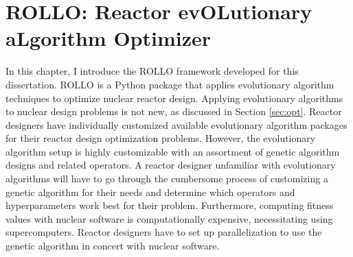 \chapter{ROLLO: Reactor evOLutionary aLgorithm Optimizer}
\label{chap:rollo}
In this chapter, I introduce the \gls{ROLLO} framework developed for this dissertation. 
\gls{ROLLO} is a Python package that applies evolutionary algorithm 
techniques to optimize nuclear reactor design. 
Applying evolutionary algorithms to nuclear design problems is not new, as
discussed in Section \ref{sec:opt}. 
Reactor designers have individually customized available evolutionary algorithm 
packages for their reactor design optimization problems.
However, the evolutionary algorithm setup is highly customizable with
an assortment of genetic algorithm designs and related operators.
A reactor designer unfamiliar with evolutionary algorithms will have
to go through the cumbersome process of customizing a genetic algorithm 
for their needs and determine which operators and hyperparameters work best for 
their problem. 
Furthermore, computing fitness values with nuclear software is computationally 
expensive, necessitating using supercomputers. 
Reactor designers have to set up parallelization to use the genetic algorithm 
in concert with nuclear software.

